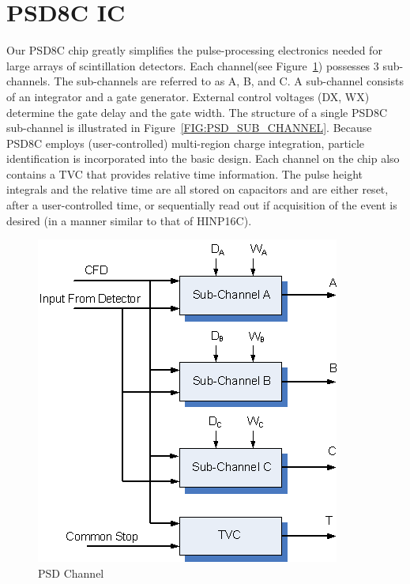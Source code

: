 \documentclass[12pt,oneside,final]{siuethesis}
\theoremstyle{definition}
\begin{document}
\section{PSD8C IC}

Our PSD8C chip greatly simplifies the pulse-processing electronics needed for large arrays of scintillation detectors. Each channel(see Figure~\ref{FIG:PSD_CHANNEL}) possesses 3 sub-channels. The sub-channels are referred to as A, B, and C. A sub-channel consists of an integrator and a gate generator. External control voltages (DX, WX) determine the gate delay and the gate width. The structure of a single PSD8C sub-channel is illustrated in Figure~\ref{FIG:PSD_SUB_CHANNEL}. Because PSD8C employs (user-controlled) multi-region charge integration, particle identification is incorporated into the basic design. Each channel on the chip also contains a TVC that provides relative time information. The pulse height integrals and the relative time are all stored on capacitors and are either reset, after a user-controlled time, or sequentially read out if acquisition of the event is desired (in a manner similar to that of HINP16C). 

\begin{figure}[htbp!]
	\centering
 	\includegraphics[scale=1.0,keepaspectratio=true]{./ch1_figures/PSD_channel.png}
 	\caption{PSD Channel}
 	\label{FIG:PSD_CHANNEL}
\end{figure}
\end{document}
